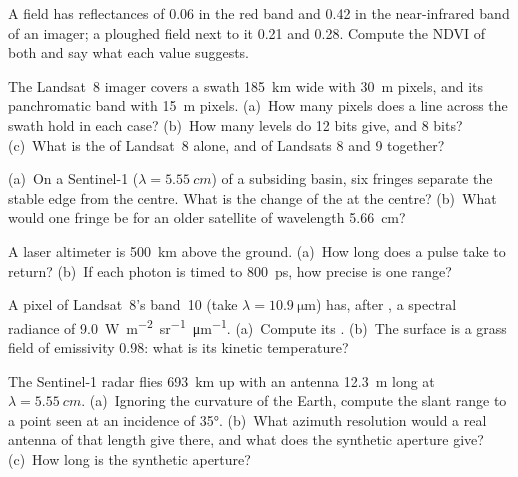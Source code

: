 \begin{exercise}[$\star$]\label{exo:b3:remote-sensing-gis:1}
A field has reflectances of 0.06 in the red band and 0.42 in the
near-infrared band of an imager; a ploughed field next to it 0.21 and
0.28. Compute the NDVI of both and say what each value suggests.
\end{exercise}

\begin{exercise}[$\star$]\label{exo:b3:remote-sensing-gis:2}
The Landsat~8 imager covers a swath \qty{185}{km} wide with \qty{30}{m}
pixels, and its panchromatic band with \qty{15}{m} pixels. (a)~How many
pixels does a line across the swath hold in each case? (b)~How many levels
do 12 bits give, and 8 bits? (c)~What is the  of Landsat~8
alone, and of Landsats 8 and 9 together?
\end{exercise}

\begin{exercise}[$\star$]\label{exo:b3:remote-sensing-gis:3}
(a)~On a Sentinel-1  ($\lambda = \qty{5.55}{cm}$) of a
subsiding basin, six fringes separate the stable edge from the centre.
What is the change of the  at the centre? (b)~What would one
fringe be for an older satellite of wavelength \qty{5.66}{cm}?
\end{exercise}

\begin{exercise}[$\star$]\label{exo:b3:remote-sensing-gis:4}
A laser altimeter is \qty{500}{km} above the ground. (a)~How long does a
pulse take to return? (b)~If each photon is timed to \qty{800}{ps}, how
precise is one range?
\end{exercise}

\begin{exercise}[$\star\star$]\label{exo:b3:remote-sensing-gis:5}
A pixel of Landsat~8's band~10 (take $\lambda = \qty{10.9}{\micro\metre}$)
has, after , a spectral radiance of
\qty{9.0}{W.m^{-2}.sr^{-1}.\micro\metre^{-1}}. (a)~Compute its . (b)~The surface is a grass field of emissivity 0.98: what is
its kinetic temperature?
\end{exercise}

\begin{exercise}[$\star\star$]\label{exo:b3:remote-sensing-gis:6}
The Sentinel-1 radar flies \qty{693}{km} up with an antenna \qty{12.3}{m}
long at $\lambda = \qty{5.55}{cm}$. (a)~Ignoring the curvature of the
Earth, compute the slant range to a point seen at an incidence of
\ang{35}. (b)~What azimuth resolution would a real antenna of that length
give there, and what does the synthetic aperture give? (c)~How long is the
synthetic aperture?
\end{exercise}

